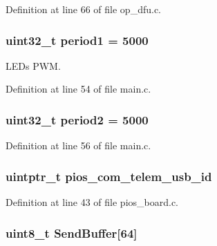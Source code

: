 \-Definition at line 66 of file op\-\_\-dfu.\-c.

\hypertarget{group___flying_f4_b_l_gabe751b3d399e053031c1e3db20b6b071}{
\subsubsection[{period1}]{\setlength{\rightskip}{0pt plus 5cm}uint32\-\_\-t {\bf period1} = 5000}}\label{group___flying_f4_b_l_gabe751b3d399e053031c1e3db20b6b071}


\-L\-E\-Ds \-P\-W\-M. 



\-Definition at line 54 of file main.\-c.

\hypertarget{group___flying_f4_b_l_gadf8633b43922fbf4f1d86981daf74ccc}{
\subsubsection[{period2}]{\setlength{\rightskip}{0pt plus 5cm}uint32\-\_\-t {\bf period2} = 5000}}\label{group___flying_f4_b_l_gadf8633b43922fbf4f1d86981daf74ccc}


\-Definition at line 56 of file main.\-c.

\hypertarget{group___flying_f4_b_l_ga513cc36d72b76de2fcb75ff233a79a4a}{
\subsubsection[{pios\-\_\-com\-\_\-telem\-\_\-usb\-\_\-id}]{\setlength{\rightskip}{0pt plus 5cm}uintptr\-\_\-t {\bf pios\-\_\-com\-\_\-telem\-\_\-usb\-\_\-id}}}\label{group___flying_f4_b_l_ga513cc36d72b76de2fcb75ff233a79a4a}


\-Definition at line 43 of file pios\-\_\-board.\-c.

\hypertarget{group___flying_f4_b_l_ga8f7836468d53f1bf54ab28474ae14624}{
\subsubsection[{\-Send\-Buffer}]{\setlength{\rightskip}{0pt plus 5cm}uint8\-\_\-t {\bf \-Send\-Buffer}\mbox{[}64\mbox{]}}}\label{group___flying_f4_b_l_ga8f7836468d53f1bf54ab28474ae14624}


